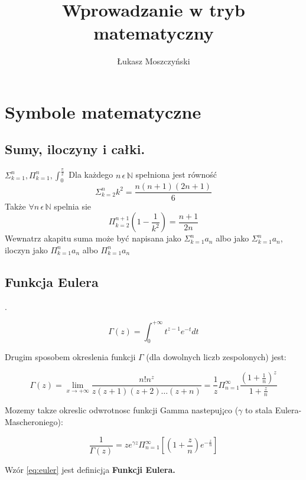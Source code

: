 \documentclass[a4paper, 12pt]{amsart}
\author{Łukasz Moszczyński}
\title{Wprowadzanie w tryb matematyczny}
\begin{document}
\maketitle
\section{Symbole matematyczne}
\subsection{Sumy, iloczyny i całki.}
\(\Sigma^{n}_{k=1},\Pi^{n}_{k=1},\int_{0}^{\frac{\pi}{2}}\)\newline
Dla każdego \( n\, \epsilon\,  \mathbb{N}\) spełniona jest równość
\[\Sigma^{n}_{k=2}k^2=\frac{n(n+1)(2n+1)}{6}\]
Także \( \forall n\, \epsilon\, \mathbb{N}\) spelnia sie
\[\Pi^{n+1}_{k=2} \left ( 1-\frac{1}{k^2} \right )=\frac{n+1}{2n}\]
\hspace{1.cm} Wewnatrz akapitu suma może być napisana jako \(\Sigma^{n}_{k=1}a_{n}\) albo jako  \(\Sigma^{n}_{k=1}a_{n}\), iloczyn jako \(\Pi^{n}_{k=1}a_{n}\) albo \(\Pi^{n}_{k=1}a_{n}\)
\subsection{Funkcja Eulera}.
 
 \begin{equation} \label{eq:euler}
 \Gamma (z)=\int^{+\infty}_{0} t^{z-1}e^{-t}dt
 \end{equation}
 
 Drugim sposobem okreslenia funkcji \(\Gamma\) (dla dowolnych liczb zespolonych) jest:
 
   \begin{equation} \label{eq:eulerdwa}
 \Gamma (z)=\lim \limits_{x \to +\infty} \frac{n!n^z}{z(z+1)(z+2) \dots (z+n)}= \frac{1}{z} \Pi_{n=1}^{\infty}\frac{(1+\frac{1}{n})^z}{1+\frac{z}{n}}
 \end{equation}
 
 Mozemy takze okreslic odwrotnosc funkcji Gamma nastepuj¡co (\(\gamma\) to stala Eulera-Mascheroniego):
 
  \begin{equation} \label{eq:eulertrzy}
\frac{1}{ \Gamma (z)}=ze^{\gamma z} \Pi_{n=1}^{\infty} [(1+\frac{z}{n})e^{-\frac{z}{n}}]
 \end{equation}
 
 Wzór \eqref{eq:euler} jest definicj¡a \bf{Funkcji Eulera.}
\end{document}
